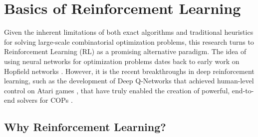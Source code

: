\section{Basics of Reinforcement Learning}
\label{sec:rl}

Given the inherent limitations of both exact algorithms and traditional heuristics for solving large-scale combinatorial optimization problems, this research turns to Reinforcement Learning (RL) as a promising alternative paradigm.
The idea of using neural networks for optimization problems dates back to early work on Hopfield networks \cite{hopfieldNeuralComputationDecisions1985}. However, it is the recent breakthroughs in deep reinforcement learning, such as the development of Deep Q-Networks that achieved human-level control on Atari games \cite{mnihHumanlevelControlDeep2015}, that have truly enabled the creation of powerful, end-to-end solvers for COPs \cite{khalilLearningCombinatorialOptimization2017}.

\subsection{Why Reinforcement Learning?}

